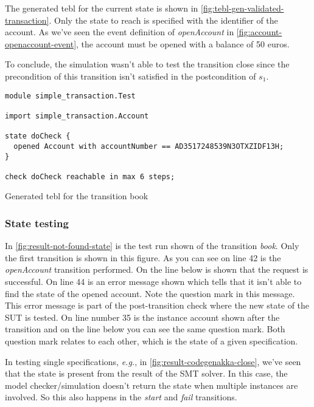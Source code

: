 The generated tebl for the current state is shown in
\autoref{fig:tebl-gen-validated-transaction}. Only the state to reach is
specified with the identifier of the account. As we've seen the event definition
of \textit{openAccount} in \autoref{fig:account-openaccount-event}, the account
must be opened with a balance of 50 euros.

To conclude, the simulation wasn't able to test the transition close since the
precondition of this transition isn't satisfied in the postcondition of $s_{1}$.

\begin{sourcecode}[h!]
\begin{lstlisting}[]
module simple_transaction.Test

import simple_transaction.Account

state doCheck {
  opened Account with accountNumber == AD3517248539N3OTXZIDF13H;
}

check doCheck reachable in max 6 steps;
\end{lstlisting}
\caption{Generated tebl for the transition book}
\label{fig:tebl-gen-validated-transaction}
\end{sourcecode}

\subsubsection{State testing}

In \autoref{fig:result-not-found-state} is the test run shown of the transition
\textit{book}. Only the first transition is shown in this figure. As you can
see on line 42 is the \textit{openAccount} transition performed. On the line
below is shown that the request is successful. On line 44 is an error message
shown which tells that it isn't able to find the state of the opened account.
Note the question mark in this message. This error message is part of the
post-transition check where the new state of the SUT is tested. On line number
35 is the instance account shown after the transition and on the line below you
can see the same question mark. Both question mark relates to each other, which
is the state of a given specification.

In testing single specifications, \textit{e.g.}, in
\autoref{fig:result-codegenakka-close}, we've seen that the state is present
from the result of the SMT solver. In this case, the model checker/simulation
doesn't return the state when multiple instances are involved. So this also
happens in the \textit{start} and \textit{fail} transitions.

